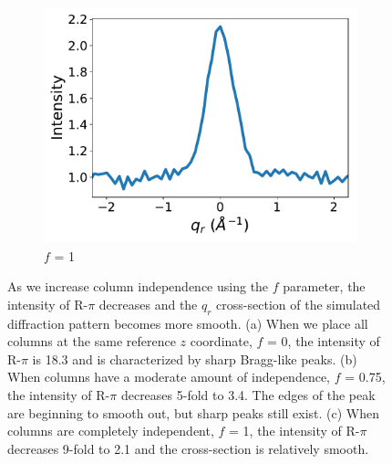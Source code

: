 \documentclass[journal=jpcbfk,manuscript=article]{achemso}
\begin{document}
\begin{figure}
  \begin{subfigure}{0.325\textwidth}
  \includegraphics[width=\textwidth]{sf_qy_sr100.pdf}
  \caption{$f$ = 1}\label{fig:sf_qy_sr100}
  \end{subfigure}
  \caption{As we increase column independence using the $f$ parameter, the
	  intensity of R-$\pi$ decreases and the $q_r$ cross-section of the simulated
	  diffraction pattern becomes more smooth.  (a) When we place all columns at the
	  same reference $z$ coordinate, $f$ = 0, the intensity of R-$\pi$ is 18.3 and is
	  characterized by sharp Bragg-like peaks. (b) When columns have a moderate
	  amount of independence, $f$ = 0.75, the intensity of R-$\pi$ decreases 5-fold
	  to 3.4. The edges of the peak are beginning to smooth out, but sharp peaks
	  still exist. (c) When columns are completely independent, $f$ = 1, the
	  intensity of R-$\pi$ decreases 9-fold to 2.1 and the cross-section is
          relatively smooth.}\label{fig:column_displacement}
  \end{figure}
\end{document}
